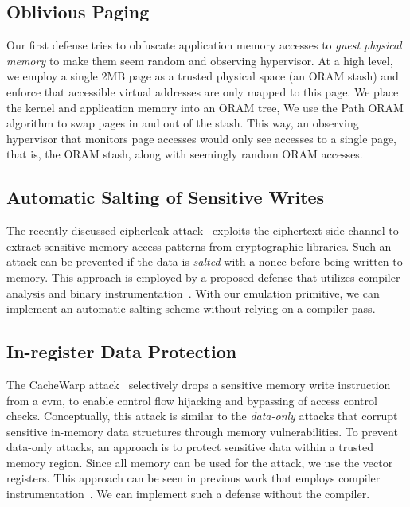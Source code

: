 \subsection{Oblivious Paging}
\label{sec:ovma}
Our first defense tries to obfuscate application memory accesses to \emph{guest physical memory} to make them seem random and observing hypervisor. At a high level, we employ a single 2MB page as a trusted physical space (an ORAM stash) and enforce that accessible virtual addresses are only mapped to this page. We place the kernel and application memory into an ORAM tree, We use the Path ORAM algorithm to swap pages in and out of the stash. This way, an observing hypervisor that monitors page accesses would only see accesses to a single page, that is, the ORAM stash, along with seemingly random ORAM accesses.


\subsection{Automatic Salting of Sensitive Writes}
The recently discussed cipherleak attack~\cite{li_cipherleaks_nodate,li_systematic_2022} exploits the ciphertext side-channel to extract sensitive memory access patterns from cryptographic libraries. 
Such an attack can be prevented if the data is \emph{salted} with a nonce before being written to memory.
This approach is employed by a proposed defense that utilizes compiler analysis and binary instrumentation~\cite{wichelmann_cipherfix_nodate}.
With our emulation primitive, we can implement an automatic salting scheme without relying on a compiler pass.


\subsection{In-register Data Protection}
The CacheWarp attack~\cite{cachewarp} selectively drops a sensitive memory write instruction from a \gls{cvm}, to enable control flow hijacking and bypassing of access control checks. 
Conceptually, this attack is similar to the \emph{data-only} attacks that corrupt sensitive in-memory data structures through memory vulnerabilities. 
To prevent data-only attacks, an approach is to protect sensitive data within a trusted memory region. Since all memory can be used for the attack, we use the vector registers. This approach can be seen in previous work that employs compiler instrumentation~\cite{dynpta}. 
We can implement such a defense without the compiler.


